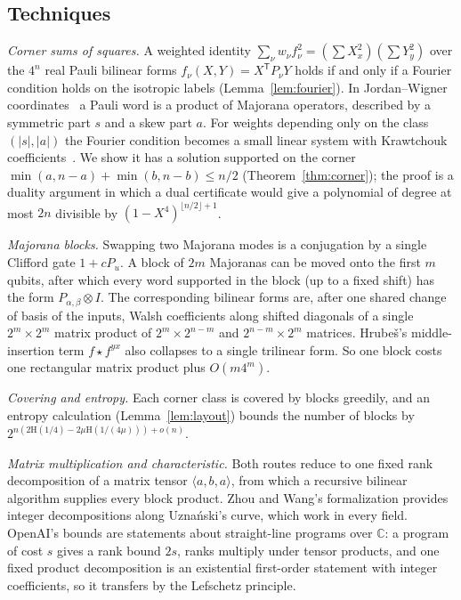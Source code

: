 \documentclass[11pt]{article}
\theoremstyle{definition}
\theoremstyle{remark}
\newcommand{\C}{\mathbb{C}}
\newcommand{\Hb}{\mathrm{H}}
\begin{document}
\subsection{Techniques}
\emph{Corner sums of squares.} A weighted identity $\sum_\nu w_\nu f_\nu^2=(\sum X_x^2)(\sum Y_y^2)$ over the $4^n$
real Pauli bilinear forms $f_\nu(X,Y)=X^{\mathsf T}P_\nu Y$ holds if and only if a Fourier condition holds on the
isotropic labels (Lemma~\ref{lem:fourier}). In Jordan--Wigner coordinates~\cite{JordanWigner1928} a Pauli word is
a product of Majorana operators, described by a symmetric part $s$ and a skew part $a$. For weights depending only
on the class $(|s|,|a|)$ the Fourier condition becomes a small linear system with Krawtchouk
coefficients~\cite{Krawtchouk1929,MacWilliamsSloane1977}. We show it has a solution supported on the corner
$\min(a,n-a)+\min(b,n-b)\le n/2$ (Theorem~\ref{thm:corner}); the proof is a duality argument in which a dual
certificate would give a polynomial of degree at most $2n$ divisible by $(1-X^4)^{\lfloor n/2\rfloor+1}$.

\emph{Majorana blocks.} Swapping two Majorana modes is a conjugation by a single Clifford gate $1+cP_u$. A block of
$2m$ Majoranas can be moved onto the first $m$ qubits, after which every word supported in the block (up to a fixed
shift) has the form $P_{\alpha,\beta}\otimes I$. The corresponding bilinear forms are, after one shared change of
basis of the inputs, Walsh coefficients along shifted diagonals of a single $2^m\times 2^m$ matrix product of
$2^m\times 2^{n-m}$ and $2^{n-m}\times 2^m$ matrices. Hrube\v{s}'s middle-insertion term $f\star f^{yx}$ also
collapses to a single trilinear form. So one block costs one rectangular matrix product plus $O(m4^m)$.

\emph{Covering and entropy.} Each corner class is covered by blocks greedily, and an entropy calculation
(Lemma~\ref{lem:layout}) bounds the number of blocks by $2^{n(2\Hb(1/4)-2\mu\Hb(1/(4\mu)))+o(n)}$.

\emph{Matrix multiplication and characteristic.} Both routes reduce to one fixed rank decomposition of a matrix
tensor $\langle a,b,a\rangle$, from which a recursive bilinear algorithm supplies every block product. Zhou and
Wang's formalization provides integer decompositions along Uzna\'nski's curve, which work in every field. OpenAI's
bounds are statements about straight-line programs over $\C$: a program of cost $s$ gives a rank bound $2s$, ranks
multiply under tensor products, and one fixed product decomposition is an existential first-order statement with
integer coefficients, so it transfers by the Lefschetz principle.
\end{document}
